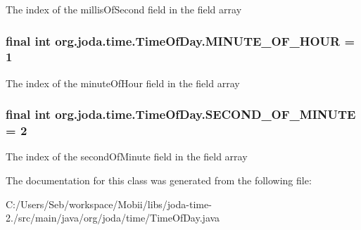 The index of the millis\-Of\-Second field in the field array \hypertarget{classorg_1_1joda_1_1time_1_1_time_of_day_a677626f485fafd75086254786d3b1397}{
\subsubsection[{M\-I\-N\-U\-T\-E\-\_\-\-O\-F\-\_\-\-H\-O\-U\-R}]{\setlength{\rightskip}{0pt plus 5cm}final int org.\-joda.\-time.\-Time\-Of\-Day.\-M\-I\-N\-U\-T\-E\-\_\-\-O\-F\-\_\-\-H\-O\-U\-R = 1\hspace{0.3cm}{\ttfamily [static]}}}\label{classorg_1_1joda_1_1time_1_1_time_of_day_a677626f485fafd75086254786d3b1397}
The index of the minute\-Of\-Hour field in the field array \hypertarget{classorg_1_1joda_1_1time_1_1_time_of_day_ab1cc4115688246202564f8ff3297a670}{
\subsubsection[{S\-E\-C\-O\-N\-D\-\_\-\-O\-F\-\_\-\-M\-I\-N\-U\-T\-E}]{\setlength{\rightskip}{0pt plus 5cm}final int org.\-joda.\-time.\-Time\-Of\-Day.\-S\-E\-C\-O\-N\-D\-\_\-\-O\-F\-\_\-\-M\-I\-N\-U\-T\-E = 2\hspace{0.3cm}{\ttfamily [static]}}}\label{classorg_1_1joda_1_1time_1_1_time_of_day_ab1cc4115688246202564f8ff3297a670}
The index of the second\-Of\-Minute field in the field array 

The documentation for this class was generated from the following file\-:\begin{DoxyCompactItemize}
\item 
C\-:/\-Users/\-Seb/workspace/\-Mobii/libs/joda-\/time-\/2./src/main/java/org/joda/time/Time\-Of\-Day.\-java\end{DoxyCompactItemize}
